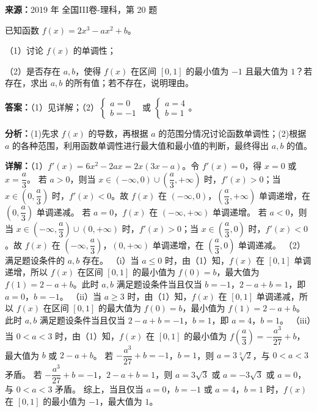 \begin{question}[points=12]
\textbf{来源：}2019 年 全国III卷-理科，第 20 题\par
已知函数 $f(x)=2x^3-ax^2+b$。

（1）讨论 $f(x)$ 的单调性；

（2）是否存在 $a,b$，使得 $f(x)$ 在区间 $[0,1]$ 的最小值为 $-1$ 且最大值为 $1$？若存在，求出 $a,b$ 的所有值；若不存在，说明理由。
\begin{solution}
\textbf{答案：}（1）见详解；（2）$\begin{cases} a=0 \\ b=-1 \end{cases}$ 或 $\begin{cases} a=4 \\ b=1 \end{cases}$。

\textbf{分析：}(1)先求 $f(x)$ 的导数，再根据 $a$ 的范围分情况讨论函数单调性；(2)根据 $a$ 的各种范围，利用函数单调性进行最大值和最小值的判断，最终得出 $a,b$ 的值。

\textbf{详解：}（1）$f'(x)=6x^2-2ax=2x(3x-a)$。令 $f'(x)=0$，得 $x=0$ 或 $x=\dfrac{a}{3}$。
若 $a>0$，则当 $x\in(-\infty,0)\cup\left(\dfrac{a}{3},+\infty\right)$ 时，$f'(x)>0$；当 $x\in\left(0,\dfrac{a}{3}\right)$ 时，$f'(x)<0$。故 $f(x)$ 在 $(-\infty,0)$，$\left(\dfrac{a}{3},+\infty\right)$ 单调递增，在 $\left(0,\dfrac{a}{3}\right)$ 单调递减。
若 $a=0$，$f(x)$ 在 $(-\infty,+\infty)$ 单调递增。
若 $a<0$，则当 $x\in\left(-\infty,\dfrac{a}{3}\right)\cup(0,+\infty)$ 时，$f'(x)>0$；当 $x\in\left(\dfrac{a}{3},0\right)$ 时，$f'(x)<0$。故 $f(x)$ 在 $\left(-\infty,\dfrac{a}{3}\right)$，$(0,+\infty)$ 单调递增，在 $\left(\dfrac{a}{3},0\right)$ 单调递减。
（2）满足题设条件的 $a,b$ 存在。
（i）当 $a\le 0$ 时，由（1）知，$f(x)$ 在 $[0,1]$ 单调递增，所以 $f(x)$ 在区间 $[0,1]$ 的最小值为 $f(0)=b$，最大值为 $f(1)=2-a+b$。此时 $a,b$ 满足题设条件当且仅当 $b=-1$，$2-a+b=1$，即 $a=0$，$b=-1$。
（ii）当 $a\ge 3$ 时，由（1）知，$f(x)$ 在 $[0,1]$ 单调递减，所以 $f(x)$ 在区间 $[0,1]$ 的最大值为 $f(0)=b$，最小值为 $f(1)=2-a+b$。此时 $a,b$ 满足题设条件当且仅当 $2-a+b=-1$，$b=1$，即 $a=4$，$b=1$。
（iii）当 $0<a<3$ 时，由（1）知，$f(x)$ 在 $[0,1]$ 的最小值为 $f\left(\dfrac{a}{3}\right)=-\dfrac{a^3}{27}+b$，最大值为 $b$ 或 $2-a+b$。
若 $-\dfrac{a^3}{27}+b=-1$，$b=1$，则 $a=3\sqrt[3]{2}$，与 $0<a<3$ 矛盾。
若 $-\dfrac{a^3}{27}+b=-1$，$2-a+b=1$，则 $a=3\sqrt{3}$ 或 $a=-3\sqrt{3}$ 或 $a=0$，与 $0<a<3$ 矛盾。
综上，当且仅当 $a=0$，$b=-1$ 或 $a=4$，$b=1$ 时，$f(x)$ 在 $[0,1]$ 的最小值为 $-1$，最大值为 $1$。
\end{solution}
\end{question}

